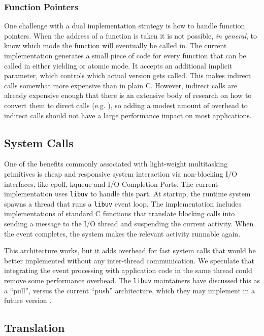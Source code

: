 \documentclass[acmsmall,anonymous,review]{acmart}\settopmatter{printfolios=true,printccs=false,printacmref=false}
\begin{document}
\subsubsection{Function Pointers}

One challenge with a dual implementation strategy is how to handle function pointers.
When the address of a function is taken it is not possible, \emph{in general}, to know which mode the function will eventually be called in.
The current implementation generates a small piece of code for every function that can be called in either yielding or atomic mode.
It accepts an additional implicit parameter, which controls which actual version gets called.
This makes indirect calls somewhat more expensive than in plain C.
However, indirect calls are already expensive enough that there is an extensive body of research on how to convert them to direct calls (e.g. \cite{Dean1995}), so adding a modest amount of overhead to indirect calls should not have a large performance impact on most applications.

\subsection{System Calls}

One of the benefits commonly associated with light-weight multitasking primitives is cheap and responsive system interaction via non-blocking I/O interfaces, like epoll, kqueue and I/O Completion Ports.
The current \charcoal{} implementation uses \texttt{libuv} to handle this part.
At startup, the runtime system spawns a thread that runs a \texttt{libuv} event loop.
The \charcoal{} implementation includes implementations of standard C functions that translate blocking calls into sending a message to the I/O thread and suspending the current activity.
When the event completes, the system makes the relevant activity runnable again.

This architecture works, but it adds overhead for fast system calls that would be better implemented without any inter-thread communication.
We speculate that integrating the event processing with application code in the same thread could remove some performance overhead.
The \texttt{libuv} maintainers have discussed this as a ``pull'', versus the current ``push'' architecture, which they may implement in a future version \cite{libuv2014}.

\subsection{Translation}
\end{document}
